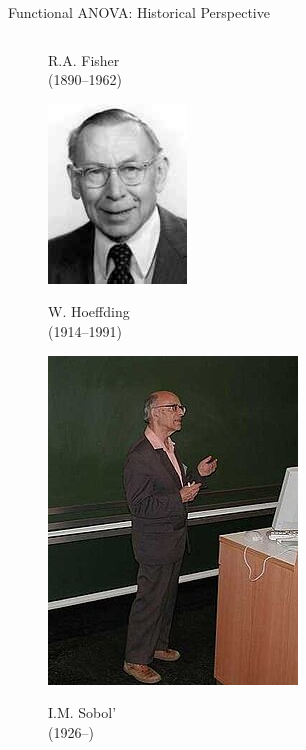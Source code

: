 \documentclass[english,aspectratio=169]{beamer}
\begin{document}
\begin{frame}[fragile]{Functional ANOVA: Historical Perspective}
\begin{columns}[T,onlytextwidth]
\begin{column}{0.40\textwidth}
\begin{figure}[ht]
\begin{minipage}[b]{0.3\linewidth}
        {\tiny R.A. Fisher \\ (1890--1962)}
        \vspace{0.7ex}
      \end{minipage}%
      \begin{minipage}[b]{0.3\linewidth}
        \centering
        \includegraphics[height=.3\textheight]{./figures/hoeffding.jpg}\par 
        {\tiny W. Hoeffding \\ (1914--1991)}
        \vspace{0.7ex}
      \end{minipage}%
      \begin{minipage}[b]{0.3\linewidth}
        \centering
        \includegraphics[height=.3\textheight]{./figures/sobol}\par
        {\tiny I.M. Sobol' \\ (1926--)}
        \vspace{0.7ex}
      \end{minipage} 
      \begin{minipage}[b]{0.3\linewidth}
        \centering

\end{minipage}
\end{figure}
\end{column}
\end{columns}
\end{frame}
\end{document}

